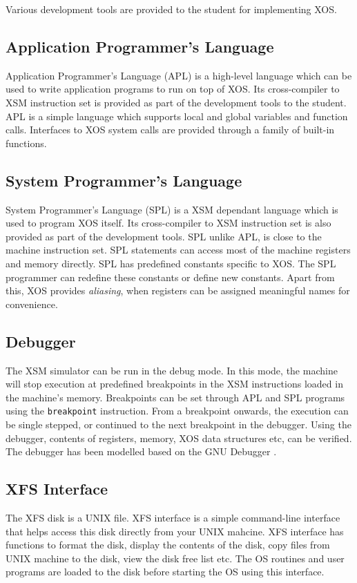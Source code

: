 \documentclass{sig-alternate}
\begin{document}
Various development tools are provided to the student for implementing XOS. 

\subsection{Application Programmer's Language}
Application Programmer's Language (APL) is a high-level language which can be used to write application programs to run on top of XOS. Its cross-compiler to XSM instruction set is provided as part of the development tools to the student. APL is a simple language which supports local and global variables and function calls. Interfaces to XOS system calls are provided through a family of built-in functions. \\


\subsection{System Programmer's Language}
System Programmer's Language (SPL) is a XSM dependant language which is used to program XOS itself. Its cross-compiler to XSM instruction set is also provided as part of the development tools. SPL unlike APL, is close to the machine instruction set. SPL statements can access most of the machine registers and memory directly. SPL has predefined constants specific to XOS. The SPL programmer can redefine these constants or define new constants. Apart from this, XOS provides \textit{aliasing}, when registers can be assigned meaningful names for convenience.\\


\subsection{Debugger}
The XSM simulator can be run in the debug mode. In this mode, the machine will stop execution at predefined breakpoints in the XSM instructions loaded in the machine's memory. Breakpoints can be set through APL and SPL programs using the \texttt{breakpoint} instruction. From a breakpoint onwards, the execution can be single stepped, or continued to the next breakpoint in the debugger. Using the debugger, contents of registers, memory, XOS data structures etc, can be verified. The debugger has been modelled based on the GNU Debugger \cite{gdb}.\\


\subsection{XFS Interface}
The XFS disk is a UNIX file. XFS interface is a simple command-line interface that helps access this disk directly from your UNIX mahcine. XFS interface has functions to format the disk, display the contents of the disk, copy files from UNIX machine to the disk, view the disk free list etc. The OS routines and user programs are loaded to the disk before starting the OS using this interface.\\
\end{document}
